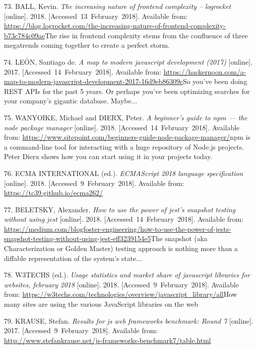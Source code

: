 \documentclass[american,a4paper,oneside,,tablecaptionabove]{scrbook}
\begin{document}
\hypertarget{ref-Ball.2018}{}
73. BALL, Kevin. \emph{The increasing nature of frontend complexity --
logrocket} {[}online{]}. 2018. {[}Accessed~13~February~2018{]}.
Available from:
\url{https://blog.logrocket.com/the-increasing-nature-of-frontend-complexity-b73c784c09ae}The
rise in frontend complexity stems from the confluence of three
megatrends coming together to create a perfect storm.

\hypertarget{ref-Leon.2017}{}
74. LEÓN, Santiago de. \emph{A map to modern javascript development
(2017)} {[}online{]}. 2017. {[}Accessed~14~February~2018{]}. Available
from:
\url{https://hackernoon.com/a-map-to-modern-javascript-development-2017-16d9eb86309c}So
you've been doing REST APIs for the past 5 years. Or perhaps you've been
optimizing searches for your company's gigantic database.
Maybe\(\ldots\)

\hypertarget{ref-Wanyoike.2018}{}
75. WANYOIKE, Michael and DIERX, Peter. \emph{A beginner's guide to npm
--- the node package manager} {[}online{]}. 2018.
{[}Accessed~14~February~2018{]}. Available from:
\url{https://www.sitepoint.com/beginners-guide-node-package-manager/}npm
is a command-line tool for interacting with a huge repository of Node.js
projects. Peter Dierx shows how you can start using it in your projects
today.

\hypertarget{ref-ECMAInternational.2018}{}
76. ECMA INTERNATIONAL (ed.). \emph{ECMAScript 2018 language
specification} {[}online{]}. 2018. {[}Accessed~9~February~2018{]}.
Available from: \url{https://tc39.github.io/ecma262/}

\hypertarget{ref-Beletsky.2018}{}
77. BELETSKY, Alexander. \emph{How to use the power of jest's snapshot
testing without using jest} {[}online{]}. 2018.
{[}Accessed~14~February~2018{]}. Available from:
\url{https://medium.com/blogfoster-engineering/how-to-use-the-power-of-jests-snapshot-testing-without-using-jest-eff3239154e5}The
snapshot (aka Characterization or Golden Master) testing approach is
nothing more than a diffable representation of the system's
state\(\ldots\)

\hypertarget{ref-W3Techs.2018}{}
78. W3TECHS (ed.). \emph{Usage statistics and market share of javascript
libraries for websites, february 2018} {[}online{]}. 2018.
{[}Accessed~9~February~2018{]}. Available from:
\url{https://w3techs.com/technologies/overview/javascript_library/all}How
many sites are using the various JavaScript libraries on the web

\hypertarget{ref-Krause.2017}{}
79. KRAUSE, Stefan. \emph{Results for js web frameworks benchmark: Round
7} {[}online{]}. 2017. {[}Accessed~9~February~2018{]}. Available from:
\url{http://www.stefankrause.net/js-frameworks-benchmark7/table.html}
\end{document}
